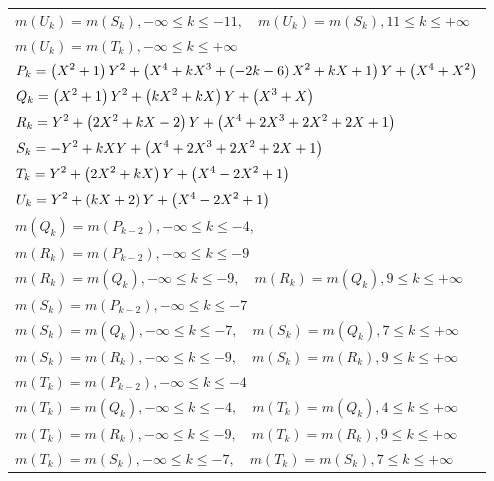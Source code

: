 \documentclass{amsart}
\begin{document}
\begin{longtable}{|l|}
\(\displaystyle m(U_k) = m(S_{k}),-\infty \leqslant k \leqslant -11,\quad m(U_k) = m(S_{k}),11 \leqslant k \leqslant +\infty\)\\
\(\displaystyle m(U_k) = m(T_{k}),-\infty \leqslant k \leqslant +\infty\)\\
\hline
\(\displaystyle P_k= \left(X^2
 + 1\right) \*Y^2
 + \left(X^4
 + k\*X^3
 + \left(-2\*k
 - 6\right) \*X^2
 + k\*X
 + 1\right) \*Y
 + \left(X^4
 + X^2\right) \)\\
\(\displaystyle Q_k= \left(X^2
 + 1\right) \*Y^2
 + \left(k\*X^2
 + k\*X\right) \*Y
 + \left(X^3
 + X\right) \)\\
\(\displaystyle R_k=Y^2
 + \left(2\*X^2
 + k\*X
 - 2\right) \*Y
 + \left(X^4
 + 2\*X^3
 + 2\*X^2
 + 2\*X
 + 1\right) \)\\
\(\displaystyle S_k=-Y^2
 + k\*X\*Y
 + \left(X^4
 + 2\*X^3
 + 2\*X^2
 + 2\*X
 + 1\right) \)\\
\(\displaystyle T_k=Y^2
 + \left(2\*X^2
 + k\*X\right) \*Y
 + \left(X^4
 - 2\*X^2
 + 1\right) \)\\
\(\displaystyle U_k=Y^2
 + \left(k\*X
 + 2\right) \*Y
 + \left(X^4
 - 2\*X^2
 + 1\right) \)\\
\(\displaystyle m(Q_k) = m(P_{k
 - 2}),-\infty \leqslant k \leqslant -4,\quad \)\\
\(\displaystyle m(R_k) = m(P_{k
 - 2}),-\infty \leqslant k \leqslant -9\)\\
\(\displaystyle m(R_k) = m(Q_{k}),-\infty \leqslant k \leqslant -9,\quad m(R_k) = m(Q_{k}),9 \leqslant k \leqslant +\infty\)\\
\(\displaystyle m(S_k) = m(P_{k
 - 2}),-\infty \leqslant k \leqslant -7\)\\
\(\displaystyle m(S_k) = m(Q_{k}),-\infty \leqslant k \leqslant -7,\quad m(S_k) = m(Q_{k}),7 \leqslant k \leqslant +\infty\)\\
\(\displaystyle m(S_k) = m(R_{k}),-\infty \leqslant k \leqslant -9,\quad m(S_k) = m(R_{k}),9 \leqslant k \leqslant +\infty\)\\
\(\displaystyle m(T_k) = m(P_{k
 - 2}),-\infty \leqslant k \leqslant -4\)\\
\(\displaystyle m(T_k) = m(Q_{k}),-\infty \leqslant k \leqslant -4,\quad m(T_k) = m(Q_{k}),4 \leqslant k \leqslant +\infty\)\\
\(\displaystyle m(T_k) = m(R_{k}),-\infty \leqslant k \leqslant -9,\quad m(T_k) = m(R_{k}),9 \leqslant k \leqslant +\infty\)\\
\(\displaystyle m(T_k) = m(S_{k}),-\infty \leqslant k \leqslant -7,\quad m(T_k) = m(S_{k}),7 \leqslant k \leqslant +\infty\)\\

\end{longtable}
\end{document}
